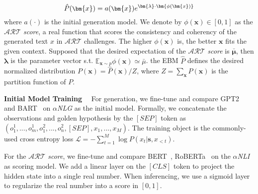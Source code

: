 \begin{equation}
    \small
    \hat{P}(\bm{x}) = a(\bm{x})e^{\bm{\lambda}\cdot\bm{\phi(\bm{x})}}
\end{equation}
where $a(\cdot)$ is the initial generation model. We denote by 
$\phi(\bm{x}) \in [0, 1]$ as the $\mathcal{ART}$ \textit{score}, a real function that scores the 
consistency and coherency of the generated text $x$ in $\mathcal{ART}$ challenges. %
The higher $\phi(\bm{x})$ is, the better $\bm{x}$ fits 
the given context. Supposed that the desired expectation of the $\mathcal{ART}$ \textit{score} is $\bar{\bm{\mu}}$, then $\bm{\lambda}$
is the parameter vector s.t. $\mathbb{E}_{\bm{x} \sim p} \phi(\bm{x}) \simeq \bar{\mu}$. %
the EBM $\hat{P}$ defines the desired normalized distribution $P(\bm{x}) = \hat{P}(\bm{x}) / Z$, where
$Z = \sum_{\bm{x}}P(\bm{x})$ is the partition function of $P$.

\noindent \textbf{Initial Model Training} ~~For generation, we fine-tune and compare GPT2~\citep{gpt2} 
and BART~\citep{bart} on $\alpha$\textit{NLG} as the initial model. Formally, we concatenate the 
observations and golden hypothesis by the $[SEP]$ token as 
$(o^1_1, ...,o^1_m, o^2_1, ..., o^2_n, [SEP], x_1, ..., x_M)$. The training
object is the commonly-used cross entropy loss $\mathcal{L} = -\sum_{t=1}^{M}\log P(x_t|\bm{s}, x_{<t})$.

For the $\mathcal{ART}$ \textit{score}, we fine-tune and compare BERT~\citep{bert},
RoBERTa~\citep{roberta} on the $\alpha$\textit{NLI} as scoring model.
We add a linear layer on the $[CLS]$ token to project the hidden state into a single real number.
When inferencing, we use a sigmoid layer to regularize the real number into a score in $[0, 1]$.


